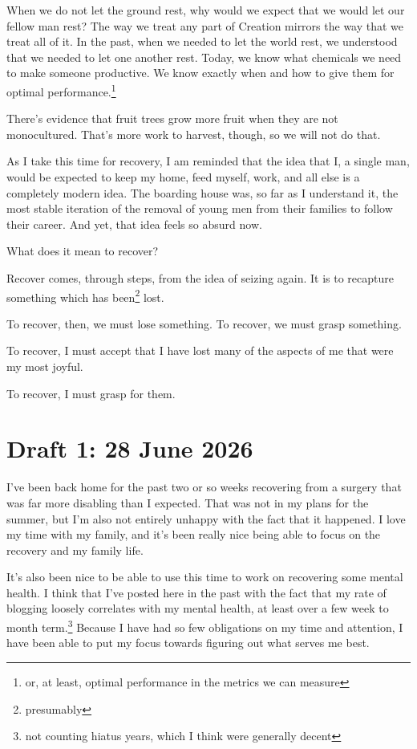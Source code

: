 \documentclass[12pt]{article}
\renewcommand{\,}{\textsuperscript{,}}
\begin{document}
When we do not let the ground rest, why would we expect that we would let our fellow man rest?  
The way we treat any part of Creation mirrors the way that we treat all of it.  
In the past, when we needed to let the world rest, we understood that we needed to let one another rest.  
Today, we know what chemicals we need to make someone productive.  
We know exactly when and how to give them for optimal performance.\footnote{or, at least, optimal performance in the metrics we can measure}

There's evidence that fruit trees grow more fruit when they are not monocultured.  
That's more work to harvest, though, so we will not do that.

As I take this time for recovery, I am reminded that the idea that I, a single man, would be expected to keep my home, feed myself, work, and all else is a completely modern idea.  
The boarding house was, so far as I understand it, the most stable iteration of the removal of young men from their families to follow their career.  
And yet, that idea feels so absurd now.

What does it mean to recover?

Recover comes, through steps, from the idea of seizing again.  
It is to recapture something which has been\footnote{presumably} lost.

To recover, then, we must lose something.  
To recover, we must grasp something.

To recover, I must accept that I have lost many of the aspects of me that were my most joyful.

To recover, I must grasp for them.

\section{Draft 1: 28 June 2026}

I've been back home for the past two or so weeks recovering from a surgery that was far more disabling than I expected.  
That was not in my plans for the summer, but I'm also not entirely unhappy with the fact that it happened.  
I love my time with my family, and it's been really nice being able to focus on the recovery and my family life.

It's also been nice to be able to use this time to work on recovering some mental health.  
I think that I've posted here in the past with the fact that my rate of blogging loosely correlates with my mental health, at least over a few week to month term.\footnote{not counting hiatus years, which I think were generally decent}  
Because I have had so few obligations on my time and attention, I have been able to put my focus towards figuring out what serves me best.
\end{document}
